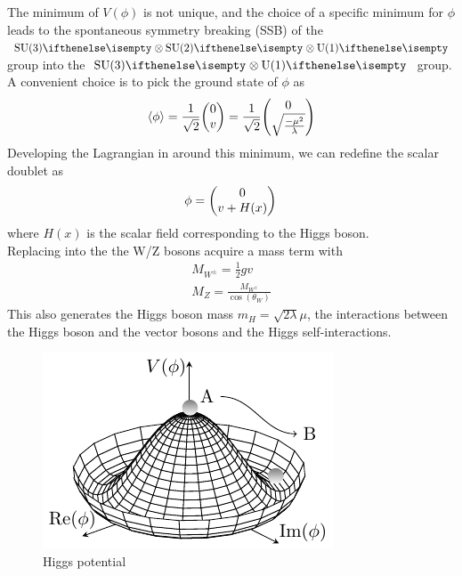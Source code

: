 The minimum of $V(\phi)$ is not unique, and the choice of a specific minimum for $\phi$ leads to the spontaneous symmetry breaking (SSB) of the $\SU{3} \otimes \SU{2} \otimes \U{1}$ group into the $\SU{3} \otimes \U{1}$ group.\\
A convenient choice is to pick the ground state of $\phi$ as
\begin{equation}
    \langle\phi\rangle=\frac{1}{\sqrt{2}}\db{0}{v}=\frac{1}{\sqrt{2}}\db{0}{\sqrt{\frac{-\mu^2}{\lambda}}}
\end{equation}
Developing the Lagrangian in  around this minimum, we can redefine the scalar doublet as
\begin{equation}\label{eq:higgs_intro}
    \phi=\db{0}{v+H(x)}
\end{equation}
where $H(x)$ is the scalar field corresponding to the Higgs boson. \\
Replacing  into the  the W/Z bosons acquire a mass term with
\begin{gather}
    M_{W^\pm}=\frac{1}{2}gv\\
    M_Z=\frac{M_{W^\pm}}{\cos (\theta_W)}
\end{gather}
This also generates the Higgs boson mass $m_H=\sqrt{2\lambda}\mu$, the interactions between the Higgs boson and the vector bosons and the Higgs self-interactions.
\begin{figure}[h!]
    \centering
    \includegraphics[width=0.95\linewidth]{fig/chap02-theory/higgs.pdf}
    \caption{Higgs potential \cite{HiggsTikZ.net}}
    \label{fig:HiggsPotential}
\end{figure}\\
